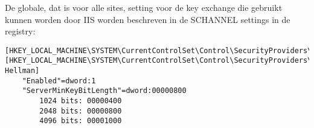 De globale, dat is voor alle sites, setting voor de key exchange die gebruikt kunnen worden door IIS worden beschreven in de SCHANNEL settings in de registry:
\begin{lstlisting}
[HKEY_LOCAL_MACHINE\SYSTEM\CurrentControlSet\Control\SecurityProviders\Schannel\KeyExchangeAlgorithms]
[HKEY_LOCAL_MACHINE\SYSTEM\CurrentControlSet\Control\SecurityProviders\SCHANNEL\KeyExchangeAlgorithms\Diffie-Hellman]
	"Enabled"=dword:1
	"ServerMinKeyBitLength"=dword:00000800
		1024 bits: 00000400
		2048 bits: 00000800
		4096 bits: 00001000
\end{lstlisting}
